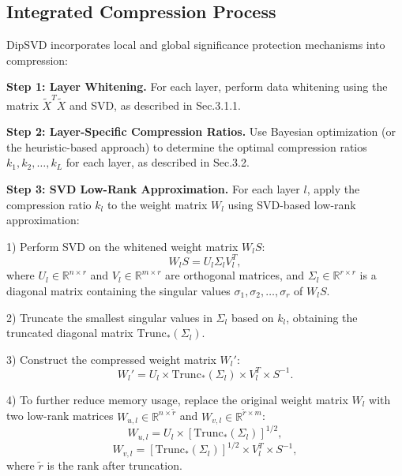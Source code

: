 \documentclass[11pt]{article}
\begin{document}
\subsection{Integrated Compression Process}
DipSVD incorporates local and global significance protection mechanisms into compression:

\textbf{Step 1: Layer Whitening.} For each layer, perform data whitening using the matrix $\tilde{X}^T \tilde{X}$ and SVD, as described in Sec.3.1.1.

\textbf{Step 2: Layer-Specific Compression Ratios.} Use Bayesian optimization (or the heuristic-based approach) to determine the optimal compression ratios \(k_1, k_2, \ldots, k_L\) for each layer, as described in Sec.3.2.

\textbf{Step 3: SVD Low-Rank Approximation.} For each layer \(l\), apply the compression ratio \(k_l\) to the weight matrix \(W_l\) using SVD-based low-rank approximation:

    1) Perform SVD on the whitened weight matrix \(W_l S\):
    \begin{equation}
       W_l S = U_l \Sigma_l V_l^{T},
    \end{equation}
    where \(U_l \in \mathbb{R}^{n \times r}\) and \(V_l \in \mathbb{R}^{m \times r}\) are orthogonal matrices, and \(\Sigma_l \in \mathbb{R}^{r \times r}\) is a diagonal matrix containing the singular values \(\sigma_1, \sigma_2, \ldots, \sigma_r\) of \(W_l S\).
    
    2) Truncate the smallest singular values in \(\Sigma_l\) based on \(k_l\), obtaining the truncated diagonal matrix \(\text{Trunc}_*(\Sigma_l)\).
    
    3) Construct the compressed weight matrix \(W_l'\):
\begin{equation}
   W_l' = U_l \times \text{Trunc}_*(\Sigma_l) \times V_l^{T} \times S^{-1}.
\end{equation}

     4) To further reduce memory usage, replace the original weight matrix \(W_l\) with two low-rank matrices \(W_{u,l} \in \mathbb{R}^{n \times \tilde{r}}\) and \(W_{v,l} \in \mathbb{R}^{\tilde{r} \times m}\):
\begin{equation}
   W_{u,l} = U_l \times [\text{Trunc}_*(\Sigma_l)]^{1/2},
\end{equation}
\begin{equation}
   W_{v,l} = [\text{Trunc}_*(\Sigma_l)]^{1/2} \times V_l^{T} \times S^{-1},
\end{equation}
   where \(\tilde{r}\) is the rank after truncation.
\end{document}
